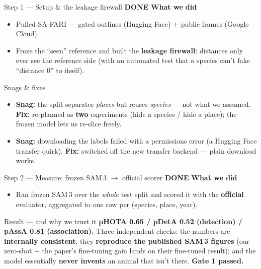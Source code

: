 \documentclass[aspectratio=169,11pt]{beamer}
\newcommand{\badge}[2]{\colorbox{#1!20}{\small\color{#1}\textbf{#2}}}
\newcommand{\dn}{\badge{forest}{DONE}}
\newcommand{\snag}[2]{\textbf{\color{burnt}Snag:} #1\; \textbf{\color{forest}Fix:} #2}
\begin{document}
\begin{frame}{Step 1 --- Setup \& the leakage firewall \hfill \dn}
  \textbf{What we did}
  \begin{itemize}
    \item Pulled SA-FARI --- gated outlines (Hugging Face) $+$ public frames (Google Cloud).
    \item Froze the ``seen'' reference and built the \textbf{leakage firewall}: distances only ever see the
          reference side (with an automated test that a species can't fake ``distance 0'' to itself).
  \end{itemize}
  \vspace{0.3em}
  \begin{block}{Snags \& fixes}\footnotesize
    \begin{itemize}
      \item \snag{the split separates \emph{places} but reuses \emph{species} --- not what we assumed.}
            {re-planned as \textbf{two} experiments (hide a species / hide a place); the frozen model lets
             us re-slice freely.}
      \item \snag{downloading the labels failed with a permissions error (a Hugging Face transfer quirk).}
            {switched off the new transfer backend --- plain download works.}
    \end{itemize}
  \end{block}
\end{frame}

\begin{frame}{Step 2 --- Measure: frozen SAM\,3 $\to$ official scorer \hfill \dn}
  \textbf{What we did}
  \begin{itemize}
    \item Ran frozen SAM\,3 over the \emph{whole} test split and scored it with the \textbf{official}
          evaluator, aggregated to one row per (species, place, year).
  \end{itemize}
  \vspace{0.3em}
  \begin{block}{Result --- and why we trust it}\footnotesize
    \textbf{pHOTA 0.65 \; / \; pDetA 0.52 (detection) \; / \; pAssA 0.81 (association).}
    \vspace{0.3em}
    Three independent checks: the numbers are \textbf{internally consistent}; they \textbf{reproduce the
    published SAM\,3 figures} (our zero-shot $+$ the paper's fine-tuning gain lands on their fine-tuned
    result); and the model essentially \textbf{never invents} an animal that isn't there.
    \textcolor{forest}{\textbf{Gate 1 passed.}}
  \end{block}
\end{frame}
\end{document}
